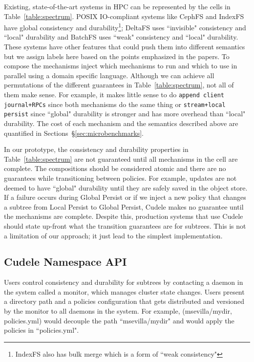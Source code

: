 Existing, state-of-the-art systems in HPC can be represented by the cells in
Table~\ref{table:spectrum}. POSIX IO-compliant systems like CephFS and IndexFS
have global consistency and durability\footnote{ IndexFS also has bulk merge
which is a form of ``weak consistency"}; DeltaFS uses ``invisible" consistency
and ``local" durability and BatchFS uses ``weak" consistency and ``local"
durability. These systems have other features that could push them into
different semantics but we assign labels here based on the points emphasized in
the papers.  To compose the mechanisms
 inject which mechanisms to run
and which to use in parallel using a domain specific language.  Although we can
achieve all permutations of the different guarantees in
Table~\ref{table:spectrum}, not all of them make sense. For example, it makes
little sense to do \texttt{append client journal+RPCs} since both mechanisms do
the same thing or \texttt{stream+local persist} since ``global" durability is
stronger and has more overhead than ``local" durability. The cost of each
mechanism and the semantics described above are quantified in
Sections~\S\ref{sec:microbenchmarks}.

In our prototype, the consistency and durability properties in
Table~\ref{table:spectrum} are not guaranteed until all mechanisms in the cell
are complete. The compositions should be considered atomic and there are no
guarantees while transitioning between policies. For example, updates are not
deemed to have ``global" durability until they are safely saved in the object
store. If a failure occurs during Global Persist or if we inject a new policy
that changes a subtree from Local Persist to Global Persist, Cudele makes no
guarantee until the mechanisms are complete. Despite this, production systems
that use Cudele should state up-front what the transition guarantees are for
subtrees. This is not a limitation of our approach; it just lead to the
simplest implementation.

\subsection{Cudele Namespace API}
\label{sec:cudelefs-namespace-api}

Users control consistency and durability for subtrees by contacting a daemon in
the system called a monitor, which manages cluster state changes.  Users
present a directory path and a policies configuration that gets distributed and
versioned by the monitor to all daemons in the system. For example,
(msevilla/mydir, policies.yml) would decouple the path ``msevilla/mydir" and
would apply the policies in ``policies.yml". 

